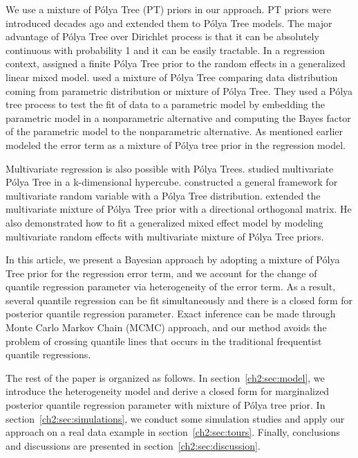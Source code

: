 \documentclass[12pt]{article}
\newcommand{\polya}{P\'{o}lya}
\begin{document}
We use a mixture of \polya{} Tree (PT) priors in our approach. PT
priors were introduced decades ago \citep{freedman1963, fabius1964,
  ferguson1974} and \citet{lavine1992, lavine1994} extended them to
\polya{} Tree models. The major advantage of \polya{} Tree over
Dirichlet process is that it can be absolutely continuous with
probability 1 and it can be easily tractable. In a regression context,
\citet{walker1997, walker1999} assigned a finite \polya{} Tree prior
to the random effects in a generalized linear mixed
model. \citet{berger2001} used a mixture of \polya{} Tree comparing
data distribution coming from parametric distribution or mixture of
\polya{} Tree. They used a \polya{} tree process to test the fit of
data to a parametric model by embedding the parametric model in a
nonparametric alternative and computing the Bayes factor of the
parametric model to the nonparametric alternative.  As mentioned
earlier \citet{hanson2002} modeled the error term as a mixture of
\polya{} tree prior in the regression model.

Multivariate regression is also possible with \polya{}
Trees. \citet{paddock1999, paddock2002} studied multivariate \polya{}
Tree in a k-dimensional hypercube. \citet{hanson2006} constructed a
general framework for multivariate random variable with a \polya{}
Tree distribution. \citet{jara2009} extended the multivariate mixture
of \polya{} Tree prior with a directional orthogonal matrix.  He also
demonstrated how to fit a generalized mixed effect model by modeling
multivariate random effects with multivariate mixture of \polya{} Tree
priors.

In this article, we present a Bayesian approach by adopting a mixture
of \polya{} Tree prior for the regression error term, and we account
for the change of quantile regression parameter via heterogeneity of
the error term. As a result, several quantile regression can be fit
simultaneously and there is a closed form for posterior quantile
regression parameter. Exact inference can be made through Monte Carlo
Markov Chain (MCMC) approach, and our method avoids the problem of
crossing quantile lines that occurs in the traditional frequentist
quantile regressions.

The rest of the paper is organized as follows. In
section~\ref{ch2:sec:model}, we introduce the heterogeneity model and
derive a closed form for marginalized posterior quantile regression
parameter with mixture of \polya{} tree prior.  In
section~\ref{ch2:sec:simulations}, we conduct some simulation studies and
apply our approach on a real data example in
section~\ref{ch2:sec:tours}. Finally, conclusions and discussions are
presented in section~\ref{ch2:sec:discussion}.
\end{document}
